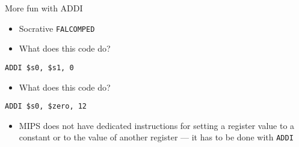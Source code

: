 \begin{frame}[fragile]{More fun with ADDI}
	\begin{itemize}
		\pause\item Socrative \texttt{FALCOMPED}
		\pause\item What does this code do?
	\end{itemize}
	\begin{lstlisting}
ADDI $s0, $s1, 0
	\end{lstlisting}
	\begin{itemize}
		\pause\item What does this code do?
	\end{itemize}
	\begin{lstlisting}
ADDI $s0, $zero, 12
	\end{lstlisting}
	\begin{itemize}
		\pause\item MIPS does not have dedicated instructions for setting a register value to a
			constant or to the value of another register --- it has to be done with \lstinline{ADDI}
	\end{itemize}
\end{frame}

